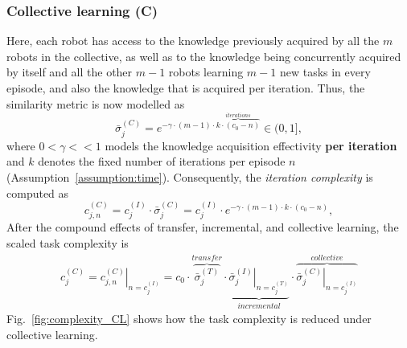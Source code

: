 \subsubsection{Collective learning (C)}
Here, each robot has access to the knowledge previously acquired by all the $m$ robots in the collective, as well as to the knowledge being concurrently acquired by itself and all the other $m-1$ robots learning $m-1$ new tasks in every episode, and also the knowledge that is acquired per iteration. %
Thus, the similarity metric is now modelled as
\begin{equation}
  \bar{\sigma}^{(C)}_j = e^{-\gamma \cdot (m-1) \cdot \overbrace{k \cdot (c_0 - n)}^{iterations}}  \in (0,1],
\end{equation}
where $0<\gamma<<1$ models the knowledge acquisition effectivity \textbf{per iteration} and $k$ denotes the fixed number of iterations per episode $n$ (Assumption~\ref{assumption:time}). Consequently, the \emph{iteration complexity} is computed as
\begin{equation}
  c^{(C)}_{j,n} = c^{(I)}_j \cdot {\bar{\sigma}^{(C)}_j} = c^{(I)}_j \cdot e^{-\gamma \cdot (m-1) \cdot k \cdot (c_0 - n)},
\end{equation}
After the compound effects of transfer, incremental, and collective learning, the scaled task complexity is
\begin{align}\label{eq:complexity_CL}
c^{(C)}_j = \left. c^{(C)}_{j,n}\right\vert_{n=c^{(I)}_j}
          = c_0 \cdot \overbrace{\bar{\sigma}^{(T)}_j}^{transfer} \cdot \underbrace{\left.{\bar{\sigma}^{(I)}_j}\right\vert_{n = c^{(T)}_j}}_{incremental}\cdot \overbrace{\left.\bar{\sigma}^{(C)}_j\right\vert_{n=c^{(I)}_j}}^{collective}
\end{align}
Fig.~\ref{fig:complexity_CL} shows how the task complexity is reduced under collective learning.
